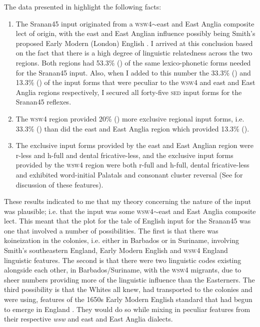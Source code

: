 The data presented in  highlight the following facts: 

\begin{enumerate}
\item{The Sranan45 input originated from a \textsc{wsw4}$\sim$east and East Anglia composite lect of origin, with the east and East Anglian influence possibly being Smith's proposed Early Modern (London) English \citep{Smith87, Smith08}. I arrived at this conclusion based on the fact that there is a high degree of linguistic relatedness across the two regions. Both regions had 53.3\% () of the same lexico-phonetic forms needed for the Sranan45 input. Also, when I added to this number the 33.3\% () and 13.3\% () of the input forms that were peculiar to the \textsc{wsw4} and east and East Anglia regions respectively, I secured all forty-five \textsc{sed} input forms for the Sranan45 reflexes.}
\item{The \textsc{wsw4} region provided 20\% () more exclusive regional input forms, i.e. 33.3\% () than did the east and East Anglia region which provided 13.3\% ().}
\item{The exclusive input forms provided by the east and East Anglian region were r-less and h-full and dental fricative-less, and the exclusive input forms provided by the \textsc{wsw4} region were both r-full and h-full, dental fricative-less and exhibited word-initial Palatals and consonant cluster reversal (See  for discussion of these features).}
\end{enumerate}

These results indicated to me that my theory concerning the nature of the input was plausible; i.e. that the input was some \textsc{wsw4}$\sim$east and East Anglia composite lect. This meant that the plot for the tale of English input for the Sranan45 was one that involved a number of possibilities. The first is that there was koineization in the colonies, i.e. either in Barbados or in Suriname, involving Smith's southeastern England, Early Modern English \citep{Smith87, Smith08} and \textsc{wsw4} England linguistic features. The second is that there were two linguistic codes existing alongside each other, in Barbados/Suriname, with the \textsc{wsw4} migrants, due to sheer numbers providing more of the linguistic influence than the Easterners. The third possibility is that the Whites all knew, had transported to the colonies and were using, features of the 1650s Early Modern English standard that had begun to emerge in England \citep{Smith87, Smith08}. They would do so while mixing in peculiar features from their respective \emph{wsw} and east and East Anglia dialects.

